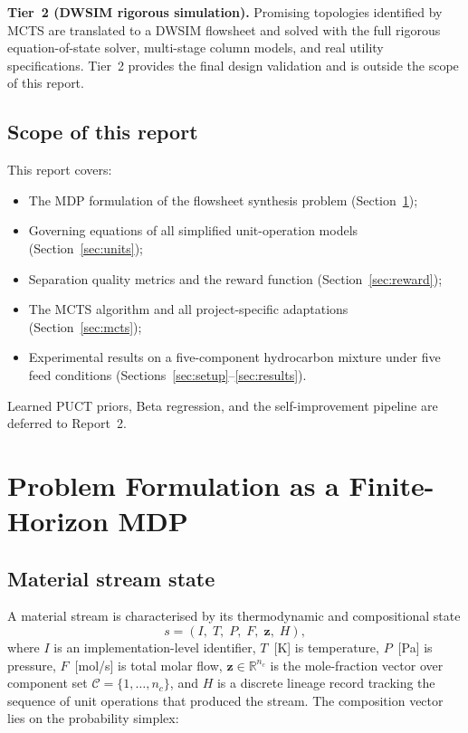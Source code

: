 \documentclass[11pt,a4paper]{article}
\theoremstyle{definition}
\theoremstyle{plain}
\newcommand{\R}{\mathbb{R}}
\newcommand{\calC}{\mathcal{C}}
\begin{document}
\textbf{Tier~2 (DWSIM rigorous simulation).} Promising topologies identified by MCTS are translated to a DWSIM flowsheet and solved with the full rigorous equation-of-state solver, multi-stage column models, and real utility specifications. Tier~2 provides the final design validation and is outside the scope of this report.

\subsection{Scope of this report}

This report covers:
\begin{itemize}
 \item The MDP formulation of the flowsheet synthesis problem
  (Section~\ref{sec:mdp});
 \item Governing equations of all simplified unit-operation
  models (Section~\ref{sec:units});
 \item Separation quality metrics and the reward function
  (Section~\ref{sec:reward});
 \item The MCTS algorithm and all project-specific
  adaptations (Section~\ref{sec:mcts});
 \item Experimental results on a five-component hydrocarbon
  mixture under five feed conditions
  (Sections~\ref{sec:setup}--\ref{sec:results}).
\end{itemize}

Learned PUCT priors, Beta regression, and the self-improvement
pipeline are deferred to Report~2.

\section{Problem Formulation as a Finite-Horizon MDP}
\label{sec:mdp}

\subsection{Material stream state}

A material stream is characterised by its thermodynamic and
compositional state
\begin{equation}
 s = (I,\; T,\; P,\; F,\; \bm{z},\; H),
 \label{eq:stream_state}
\end{equation}
where $I$ is an implementation-level identifier, $T$~[K] is temperature, $P$~[Pa] is pressure, $F$~[mol/s] is total molar flow, $\bm{z} \in \R^{n_c}$ is the mole-fraction vector over component set $\calC = \{1,\ldots,n_c\}$, and $H$ is a discrete lineage record tracking the sequence of unit operations that produced the stream. The composition vector lies on the probability simplex:
\end{document}
